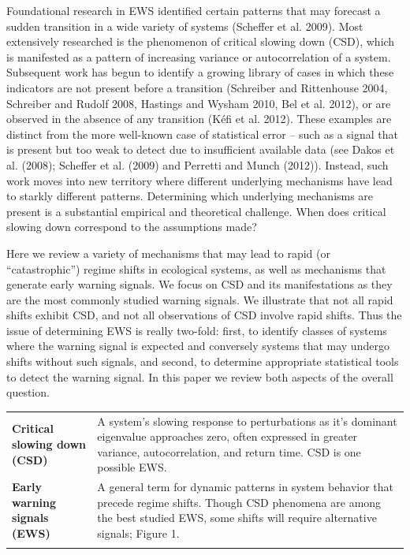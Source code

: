 \documentclass{article}
\begin{document}
Foundational research in EWS identified certain patterns that may
forecast a sudden transition in a wide variety of systems (Scheffer et
al. 2009). Most extensively researched is the phenomenon of critical
slowing down (CSD), which is manifested as a pattern of increasing
variance or autocorrelation of a system. Subsequent work has begun to
identify a growing library of cases in which these indicators are not
present before a transition (Schreiber and Rittenhouse 2004, Schreiber
and Rudolf 2008, Hastings and Wysham 2010, Bel et al. 2012), or are
observed in the absence of any transition (Kéfi et al. 2012). These
examples are distinct from the more well-known case of statistical error
-- such as a signal that is present but too weak to detect due to
insufficient available data (see Dakos et al. (2008); Scheffer et al.
(2009) and Perretti and Munch (2012)). Instead, such work moves into new
territory where different underlying mechanisms have lead to starkly
different patterns. Determining which underlying mechanisms are present
is a substantial empirical and theoretical challenge. When does critical
slowing down correspond to the assumptions made?

Here we review a variety of mechanisms that may lead to rapid (or
``catastrophic'') regime shifts in ecological systems, as well as
mechanisms that generate early warning signals. We focus on CSD and its
manifestations as they are the most commonly studied warning signals. We
illustrate that not all rapid shifts exhibit CSD, and not all
observations of CSD involve rapid shifts. Thus the issue of determining
EWS is really two-fold: first, to identify classes of systems where the
warning signal is expected and conversely systems that may undergo
shifts without such signals, and second, to determine appropriate
statistical tools to detect the warning signal. In this paper we review
both aspects of the overall question.

\begin{longtable}[c]{@{}ll@{}}
\hline\noalign{\medskip}
\begin{minipage}[t]{0.42\columnwidth}\raggedright
\textbf{Critical slowing down (CSD)}
\end{minipage} & \begin{minipage}[t]{0.55\columnwidth}\raggedright
A system's slowing response to perturbations as it's dominant eigenvalue
approaches zero, often expressed in greater variance, autocorrelation,
and return time. CSD is one possible EWS.
\end{minipage}
\\\noalign{\medskip}
\begin{minipage}[t]{0.42\columnwidth}\raggedright
\textbf{Early warning signals (EWS)}
\end{minipage} & \begin{minipage}[t]{0.55\columnwidth}\raggedright
A general term for dynamic patterns in system behavior that precede
regime shifts. Though CSD phenomena are among the best studied EWS, some
shifts will require alternative signals; Figure 1.
\end{minipage}
\\\noalign{\medskip}
\hline
\end{longtable}
\end{document}
